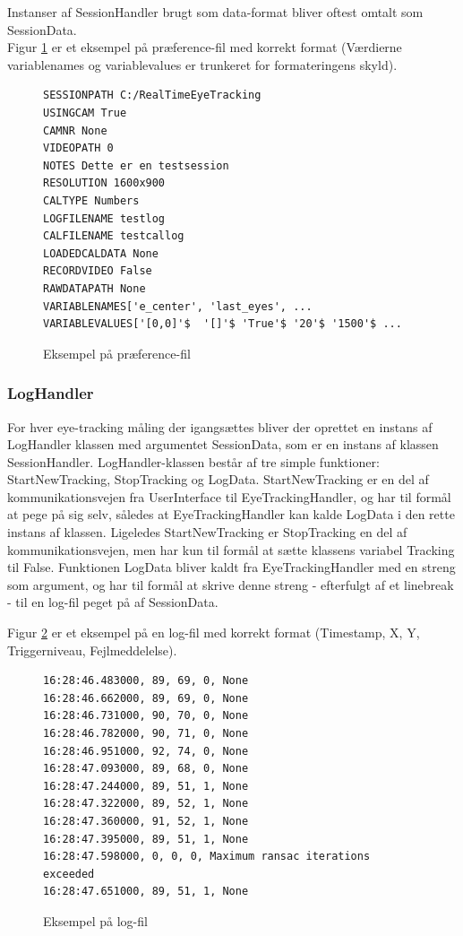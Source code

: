 \documentclass[rapport.tex]{subfiles}
\begin{document}
	Instanser af SessionHandler brugt som data-format bliver oftest omtalt som SessionData.\\
	
	Figur \ref{list:sessionfile} er et eksempel på præference-fil med korrekt format (Værdierne variablenames og variablevalues er trunkeret for formateringens skyld). 
\begin{figure}
\caption{Eksempel på præference-fil}
\label{list:sessionfile}
\begin{lstlisting}
SESSIONPATH C:/RealTimeEyeTracking
USINGCAM True
CAMNR None
VIDEOPATH 0
NOTES Dette er en testsession
RESOLUTION 1600x900
CALTYPE Numbers
LOGFILENAME testlog
CALFILENAME testcallog
LOADEDCALDATA None
RECORDVIDEO False
RAWDATAPATH None
VARIABLENAMES['e_center', 'last_eyes', ...
VARIABLEVALUES['[0,0]'$  '[]'$ 'True'$ '20'$ '1500'$ ...
\end{lstlisting}
\end{figure}
		
	\subsubsection{LogHandler}
	For hver eye-tracking måling der igangsættes bliver der oprettet en instans af LogHandler klassen med argumentet SessionData, som er en instans af klassen SessionHandler. LogHandler-klassen består af tre simple funktioner: StartNewTracking, StopTracking og LogData. StartNewTracking er en del af kommunikationsvejen fra UserInterface til EyeTrackingHandler, og har til formål at pege på sig selv, således at EyeTrackingHandler kan kalde LogData i den rette instans af klassen. 
	Ligeledes StartNewTracking er StopTracking en del af kommunikationsvejen, men har kun til formål at sætte klassens variabel Tracking til False. Funktionen LogData bliver kaldt fra EyeTrackingHandler med en streng som argument, og har til formål at skrive denne streng - efterfulgt af et linebreak - til en log-fil peget på af SessionData.  
	
	Figur \ref{list:logfile} er et eksempel på en log-fil med korrekt format (Timestamp, X, Y, Triggerniveau, Fejlmeddelelse). 
\begin{figure}
	\caption{Eksempel på log-fil}
	\label{list:logfile}
	\begin{lstlisting}	
16:28:46.483000, 89, 69, 0, None
16:28:46.662000, 89, 69, 0, None
16:28:46.731000, 90, 70, 0, None
16:28:46.782000, 90, 71, 0, None
16:28:46.951000, 92, 74, 0, None
16:28:47.093000, 89, 68, 0, None
16:28:47.244000, 89, 51, 1, None
16:28:47.322000, 89, 52, 1, None
16:28:47.360000, 91, 52, 1, None
16:28:47.395000, 89, 51, 1, None
16:28:47.598000, 0, 0, 0, Maximum ransac iterations exceeded
16:28:47.651000, 89, 51, 1, None
\end{lstlisting}
\end{figure}	
	
\end{document}
